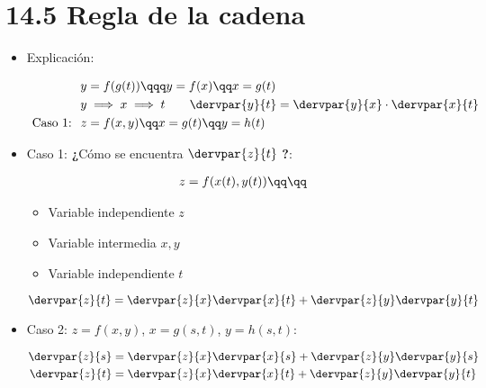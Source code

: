 \documentclass{article}
\begin{document}
\section{ 14.5 Regla de la cadena}
\begin{itemize}
    \item Explicación: 
    \begin{center}
       \begin{align*}
           y &= f(g(t)) \qqq y =f(x) \qq x=g(t) \\ 
           y &\implies x \implies t \qquad \dervpar{y}{t} = \dervpar{y}{x} \cdot \dervpar{x}{t} \\   
           \text{ Caso 1: } \; z&= f(x,y) \qq x = g(t) \qq y=h(t) \\ 
       \end{align*}
    \end{center}
    
    \item  Caso 1: \textbf{¿}Cómo se encuentra $\dervpar{z}{t}$ \textbf{?}:
        \begin{center}
           \begin{align*}
            z = f(x(t),y(t)) \qq \qq \\ 
           \end{align*}
           \begin{itemize}
               \item Variable independiente $z$ 
               \item Variable intermedia $x,y$
               \item Variable independiente $t$
           \end{itemize}
           \[
             \dervpar{z}{t} = \dervpar{z}{x} \dervpar{x}{t} + \dervpar{z}{y} \dervpar{y}{t} 
           \]
        \end{center}
    
    \item Caso 2: $z = f(x,y)$, $x = g(s,t)$, $y = h(s,t)$: 
        \begin{center}
           \begin{align*}
               \dervpar{z}{s} &= \dervpar{z}{x} \dervpar{x}{s} + \dervpar{z}{y} \dervpar{y}{s} \\ 
               \dervpar{z}{t} &= \dervpar{z}{x} \dervpar{x}{t} + \dervpar{z}{y} \dervpar{y}{t} \\ 
           \end{align*}
        \end{center}
\end{itemize}
\end{document}
